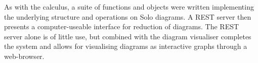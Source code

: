 As with the calculus, a suite of functions and objects were written implementing the underlying structure and operations on Solo diagrams.
A REST server then presents a computer-useable interface for reduction of diagrams.
The REST server alone is of little use, but combined with the diagram visualiser completes the system and allows for visualising diagrams as interactive graphs through a web-browser.

